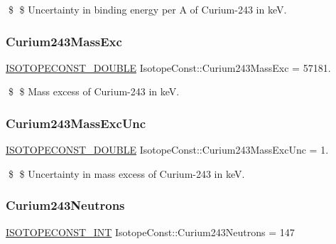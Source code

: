 \$ \$ Uncertainty in binding energy per A of Curium-\/243 in keV. \mbox{\label{group___isotope_const-_curium-_cm243_gaf6d4bc18737b0379fe7e24a57878f64b}} 
\subsubsection{\texorpdfstring{Curium243\+Mass\+Exc}{Curium243MassExc}}
{\footnotesize\ttfamily \mbox{\hyperlink{group___isotope_const-_macros_ga8f45a7272ce02c0b4c65c44636ed719a}{I\+S\+O\+T\+O\+P\+E\+C\+O\+N\+S\+T\+\_\+\+D\+O\+U\+B\+LE}} Isotope\+Const\+::\+Curium243\+Mass\+Exc = 57181.}

\$ \$ Mass excess of Curium-\/243 in keV. \mbox{\label{group___isotope_const-_curium-_cm243_ga259c2192871f6e1c0735fd4b334b984d}} 
\subsubsection{\texorpdfstring{Curium243\+Mass\+Exc\+Unc}{Curium243MassExcUnc}}
{\footnotesize\ttfamily \mbox{\hyperlink{group___isotope_const-_macros_ga8f45a7272ce02c0b4c65c44636ed719a}{I\+S\+O\+T\+O\+P\+E\+C\+O\+N\+S\+T\+\_\+\+D\+O\+U\+B\+LE}} Isotope\+Const\+::\+Curium243\+Mass\+Exc\+Unc = 1.}

\$ \$ Uncertainty in mass excess of Curium-\/243 in keV. \mbox{\label{group___isotope_const-_curium-_cm243_ga302b50815792888554a59b0a2918ff74}} 
\subsubsection{\texorpdfstring{Curium243\+Neutrons}{Curium243Neutrons}}
{\footnotesize\ttfamily \mbox{\hyperlink{group___isotope_const-_macros_ga5f18360b3e99483a35c32d789e62621c}{I\+S\+O\+T\+O\+P\+E\+C\+O\+N\+S\+T\+\_\+\+I\+NT}} Isotope\+Const\+::\+Curium243\+Neutrons = 147}


